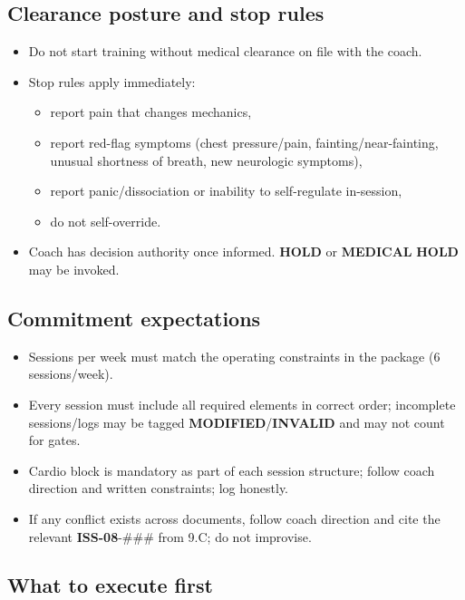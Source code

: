 \documentclass[10pt]{article}
\begin{document}
\subsection*{Clearance posture and stop rules}
{}

\begin{itemize}
\item Do not start training without medical clearance on file with the coach.
\item Stop rules apply immediately:
  \begin{itemize}
  \item report pain that changes mechanics,
  \item report red-flag symptoms (chest pressure/pain, fainting/near-fainting, unusual shortness of breath, new neurologic symptoms),
  \item report panic/dissociation or inability to self-regulate in-session,
  \item do not self-override.
  \end{itemize}
\item Coach has decision authority once informed. \textbf{HOLD} or \textbf{MEDICAL} \textbf{HOLD} may be invoked.
\end{itemize}

\subsection*{Commitment expectations}
{}

\begin{itemize}
\item Sessions per week must match the operating constraints in the package (6 sessions/week).
\item Every session must include all required elements in correct order; incomplete sessions/logs may be tagged \textbf{MODIFIED}/\textbf{INVALID} and may not count for gates.
\item Cardio block is mandatory as part of each session structure; follow coach direction and written constraints; log honestly.
\item If any conflict exists across documents, follow coach direction and cite the relevant \textbf{ISS-08}-\#\#\# from 9.C; do not improvise.
\end{itemize}

\subsection*{What to execute first}
{}
\end{document}
